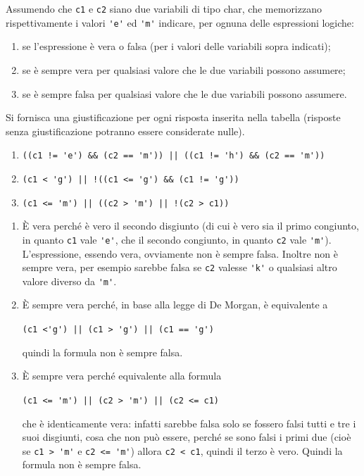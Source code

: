\begin{Exercise}[label={ex:logica}]
  	Assumendo che \texttt{c1} e \texttt{c2} siano due variabili di tipo char, che memorizzano rispettivamente i valori \verb|'e'| ed \verb|'m'| indicare, per ognuna delle espressioni logiche:
  
	  \begin{enumerate}
			  \item se l'espressione \`e vera o falsa (per i valori delle variabili sopra indicati);
			  \item se \`e sempre vera per qualsiasi valore che le due variabili possono assumere;
			  \item se \`e sempre falsa per qualsiasi valore che le due variabili possono assumere.
	  \end{enumerate}

  	Si fornisca una giustificazione per ogni risposta inserita nella tabella (risposte senza giustificazione potranno essere considerate nulle).

		\begin{enumerate}
			  \item \verb#((c1 != 'e') && (c2 == 'm')) || ((c1 != 'h') && (c2 == 'm'))#
			  \item \verb#(c1 < 'g') || !((c1 <= 'g') && (c1 != 'g'))#
			  \item \verb#(c1 <= 'm') || ((c2 > 'm') || !(c2 > c1))#
		\end{enumerate}
\end{Exercise}

\begin{Answer}[ref={ex:logica}]
\begin{enumerate}
	  \item \`E vera perch\'e \`e vero il secondo disgiunto (di cui \`e vero sia il primo congiunto, in quanto \texttt{c1} vale \verb|'e'|, che il secondo congiunto, in quanto \texttt{c2} vale \verb|'m'|). L'espressione, essendo vera, ovviamente non \`e sempre falsa. Inoltre non \`e sempre vera, per esempio sarebbe falsa se \texttt{c2} valesse \verb|'k'| o qualsiasi altro valore diverso da \verb|'m'|.
  	\item \`E sempre vera perch\'e, in base alla legge di De Morgan, \`e equivalente a
	  \begin{center}
	  		\verb#(c1 <'g') || (c1 > 'g') || (c1 == 'g')#
	  \end{center}
	  quindi la formula non \`e sempre falsa.
	  \item \`E sempre vera perch\'e equivalente alla formula
	    \begin{center}
	  		\verb#(c1 <= 'm') || (c2 > 'm') || (c2 <= c1)#
	  \end{center}
	  che \`e identicamente vera: infatti sarebbe falsa solo se fossero falsi tutti e tre i suoi disgiunti, cosa che non pu\`o essere, perch\'e se sono falsi i primi due (cio\`e se \verb#c1 > 'm'# e \verb#c2 <= 'm'#) allora \verb#c2 < c1#, quindi il terzo \`e vero. Quindi la formula non \`e sempre falsa.
\end{enumerate}
  
\end{Answer}